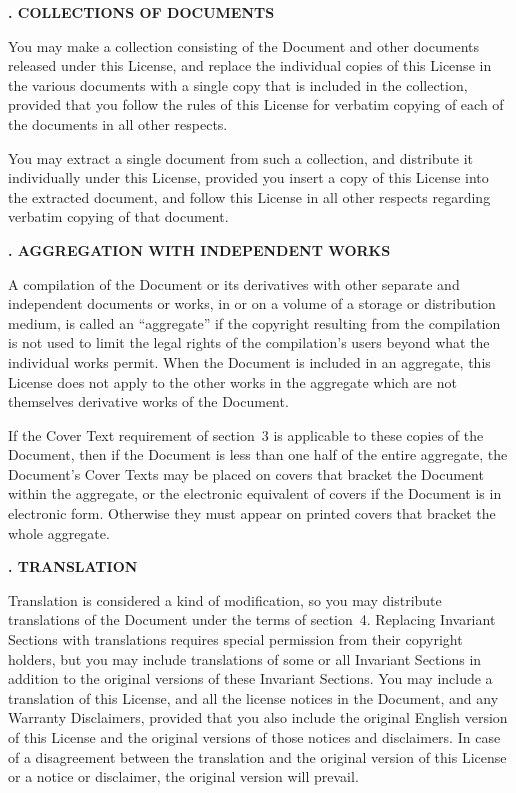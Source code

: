 \begin{flushleft}
    {\large\bfseries{}. COLLECTIONS OF DOCUMENTS\par}
\end{flushleft}

You may make a collection consisting of the Document and other documents
released under this License, and replace the individual copies of this
License in the various documents with a single copy that is included in
the collection, provided that you follow the rules of this License for
verbatim copying of each of the documents in all other respects.

You may extract a single document from such a collection, and distribute
it individually under this License, provided you insert a copy of this
License into the extracted document, and follow this License in all
other respects regarding verbatim copying of that document.


\begin{flushleft}
    {\large\bfseries{}. AGGREGATION WITH INDEPENDENT WORKS\par}
\end{flushleft}


A compilation of the Document or its derivatives with other separate
and independent documents or works, in or on a volume of a storage or
distribution medium, is called an ``aggregate'' if the copyright
resulting from the compilation is not used to limit the legal rights
of the compilation's users beyond what the individual works permit.
When the Document is included in an aggregate, this License does not
apply to the other works in the aggregate which are not themselves
derivative works of the Document.

If the Cover Text requirement of section~3 is applicable to these
copies of the Document, then if the Document is less than one half of
the entire aggregate, the Document's Cover Texts may be placed on
covers that bracket the Document within the aggregate, or the
electronic equivalent of covers if the Document is in electronic form.
Otherwise they must appear on printed covers that bracket the whole
aggregate.


\begin{flushleft}
    {\large\bfseries{}. TRANSLATION\par}
\end{flushleft}


Translation is considered a kind of modification, so you may
distribute translations of the Document under the terms of section~4.
Replacing Invariant Sections with translations requires special
permission from their copyright holders, but you may include
translations of some or all Invariant Sections in addition to the
original versions of these Invariant Sections.  You may include a
translation of this License, and all the license notices in the
Document, and any Warranty Disclaimers, provided that you also include
the original English version of this License and the original versions
of those notices and disclaimers.  In case of a disagreement between
the translation and the original version of this License or a notice
or disclaimer, the original version will prevail.

